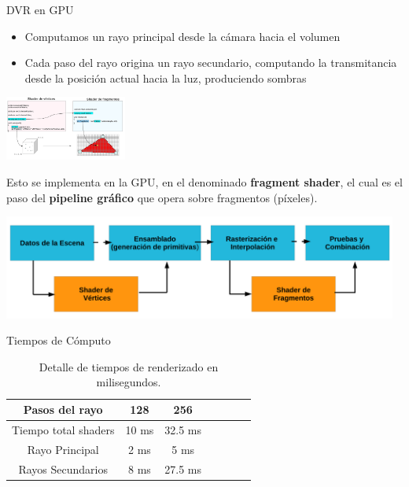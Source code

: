 \documentclass[spanish]{beamer}
\begin{document}
\begin{frame}{DVR en GPU}

\begin{itemize}
\item Computamos un rayo principal desde la cámara hacia el volumen
\item Cada paso del rayo origina un rayo secundario, computando la transmitancia desde la posición actual hacia la luz, produciendo sombras
\end{itemize}

\centerline{\includegraphics[width=4cm]{../figures/fragmentshader}}

\end{frame}

\begin{frame}
Esto se implementa en la GPU, en el denominado \textbf{fragment shader}, el cual es el paso del \textbf{pipeline gráfico} que opera sobre fragmentos (píxeles).

\centerline{\includegraphics[width=13cm]{../figures/pipelinegrafico}}
\end{frame}

\begin{frame}{Tiempos de Cómputo}

\begin{table}[htb]
\centering

\begin{tabular}{|c|c|c|c|c|c|c|}
\hline
 Pasos del rayo         & 128 &  256 \\
\hline
\hline
 Tiempo total shaders   & 10 ms &  32.5 ms \\
\hline
 Rayo Principal         & 2 ms  & 5 ms  \\
\hline
 Rayos Secundarios      &  8 ms & 27.5 ms  \\
\hline
\end{tabular}
\caption{Detalle de tiempos de renderizado en milisegundos.}
\label{tab:n2}
\end{table}


\end{frame}
\end{document}
